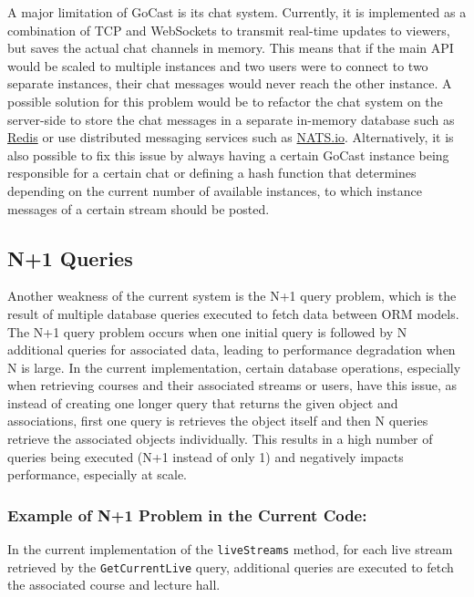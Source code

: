 A major limitation of GoCast is its chat system. Currently, it is implemented as a combination of TCP and WebSockets to transmit real-time updates to viewers, but saves the actual chat channels in memory. This means that if the main \ac{API} would be scaled to multiple instances and two users were to connect to two separate instances, their chat messages would never reach the other instance. A possible solution for this problem would be to refactor the chat system on the server-side to store the chat messages in a separate in-memory database such as \href{https://redis.io/}{Redis} or use distributed messaging services such as \href{https://github.com/nats-io/nats-server}{NATS.io}. Alternatively, it is also possible to fix this issue by always having a certain GoCast instance being responsible for a certain chat or defining a hash function that determines depending on the current number of available instances, to which instance messages of a certain stream should be posted. 

\subsection{N+1 Queries}

Another weakness of the current system is the N+1 query problem, which is the result of multiple database queries executed to fetch data between \ac{ORM} models. The N+1 query problem occurs when one initial query is followed by N additional queries for associated data, leading to performance degradation when N is large. In the current implementation, certain database operations, especially when retrieving courses and their associated streams or users, have this issue, as instead of creating one longer query that returns the given object and associations, first one query is retrieves the object itself and then N queries retrieve the associated objects individually. This results in a high number of queries being executed (N+1 instead of only 1) and negatively impacts performance, especially at scale.

\subsubsection{Example of N+1 Problem in the Current Code:}

In the current implementation of the \texttt{liveStreams} method, for each live stream retrieved by the \texttt{GetCurrentLive} query, additional queries are executed to fetch the associated course and lecture hall.

